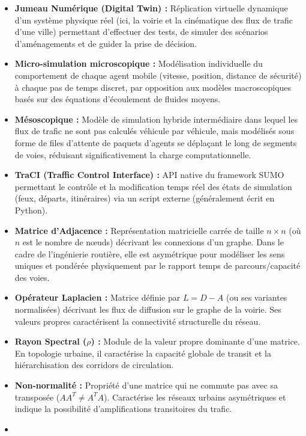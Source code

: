 \documentclass[11pt, a4paper]{article}
\providecommand{\tightlist}{}
\begin{document}
\begin{itemize}
\tightlist
\item
  \textbf{Jumeau Numérique (Digital Twin) :} Réplication virtuelle
  dynamique d'un système physique réel (ici, la voirie et la cinématique
  des flux de trafic d'une ville) permettant d'effectuer des tests, de
  simuler des scénarios d'aménagements et de guider la prise de
  décision.
\item
  \textbf{Micro-simulation microscopique :} Modélisation individuelle du
  comportement de chaque agent mobile (vitesse, position, distance de
  sécurité) à chaque pas de temps discret, par opposition aux modèles
  macroscopiques basés sur des équations d'écoulement de fluides moyens.
\item
  \textbf{Mésoscopique :} Modèle de simulation hybride intermédiaire
  dans lequel les flux de trafic ne sont pas calculés véhicule par
  véhicule, mais modélisés sous forme de files d'attente de paquets
  d'agents se déplaçant le long de segments de voies, réduisant
  significativement la charge computationnelle.
\item
  \textbf{TraCI (Traffic Control Interface) :} API native du framework
  SUMO permettant le contrôle et la modification temps réel des états de
  simulation (feux, départs, itinéraires) via un script externe
  (généralement écrit en Python).
\item
  \textbf{Matrice d'Adjacence :} Représentation matricielle carrée de
  taille \(n \times n\) (où \(n\) est le nombre de nœuds) décrivant les
  connexions d'un graphe. Dans le cadre de l'ingénierie routière, elle
  est asymétrique pour modéliser les sens uniques et pondérée
  physiquement par le rapport temps de parcours/capacité des voies.
\item
  \textbf{Opérateur Laplacien :} Matrice définie par \(L = D - A\) (ou
  ses variantes normalisées) décrivant les flux de diffusion sur le
  graphe de la voirie. Ses valeurs propres caractérisent la connectivité
  structurelle du réseau.
\item
  \textbf{Rayon Spectral (\(\rho\)) :} Module de la valeur propre
  dominante d'une matrice. En topologie urbaine, il caractérise la
  capacité globale de transit et la hiérarchisation des corridors de
  circulation.
\item
  \textbf{Non-normalité :} Propriété d'une matrice qui ne commute pas
  avec sa transposée (\(A A^T \neq A^T A\)). Caractérise les réseaux
  urbains asymétriques et indique la possibilité d'amplifications
  transitoires du trafic.
\item

\end{itemize}
\end{document}
